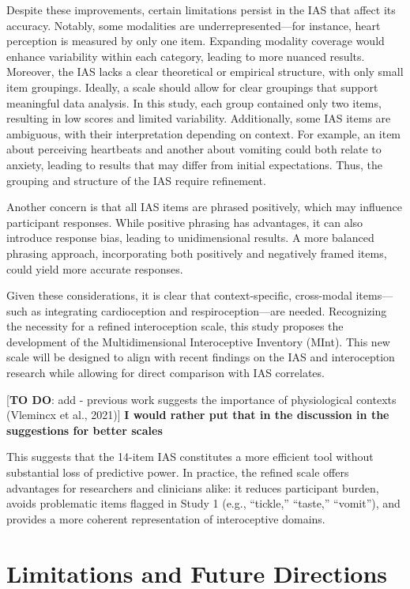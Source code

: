 \documentclass[
  jou,
  floatsintext,
  longtable,
  nolmodern,
  notxfonts,
  notimes,
  colorlinks=true,linkcolor=blue,citecolor=blue,urlcolor=blue]{apa7}
\begin{document}
Despite these improvements, certain limitations persist in the IAS that
affect its accuracy. Notably, some modalities are underrepresented---for
instance, heart perception is measured by only one item. Expanding
modality coverage would enhance variability within each category,
leading to more nuanced results. Moreover, the IAS lacks a clear
theoretical or empirical structure, with only small item groupings.
Ideally, a scale should allow for clear groupings that support
meaningful data analysis. In this study, each group contained only two
items, resulting in low scores and limited variability. Additionally,
some IAS items are ambiguous, with their interpretation depending on
context. For example, an item about perceiving heartbeats and another
about vomiting could both relate to anxiety, leading to results that may
differ from initial expectations. Thus, the grouping and structure of
the IAS require refinement.

Another concern is that all IAS items are phrased positively, which may
influence participant responses. While positive phrasing has advantages,
it can also introduce response bias, leading to unidimensional results.
A more balanced phrasing approach, incorporating both positively and
negatively framed items, could yield more accurate responses.

Given these considerations, it is clear that context-specific,
cross-modal items---such as integrating cardioception and
respiroception---are needed. Recognizing the necessity for a refined
interoception scale, this study proposes the development of the
Multidimensional Interoceptive Inventory (MInt). This new scale will be
designed to align with recent findings on the IAS and interoception
research while allowing for direct comparison with IAS correlates.

{[}\textbf{TO DO}: add - previous work suggests the importance of
physiological contexts (Vlemincx et al., 2021){]} \textbf{I would rather
put that in the discussion in the suggestions for better scales}

This suggests that the 14-item IAS constitutes a more efficient tool
without substantial loss of predictive power. In practice, the refined
scale offers advantages for researchers and clinicians alike: it reduces
participant burden, avoids problematic items flagged in Study 1 (e.g.,
``tickle,'' ``taste,'' ``vomit''), and provides a more coherent
representation of interoceptive domains.

\section{Limitations and Future
Directions}\label{limitations-and-future-directions}
\end{document}
